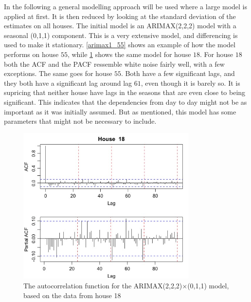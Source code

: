 \noindent In the following a general modelling approach will be used where a large model is applied at first. It is then reduced by looking at the standard deviation of the estimates on all houses. The initial model is an ARIMAX(2,2,2) model with a seasonal (0,1,1) component. This is a very extensive model, and differencing is used to make it stationary. \cref{arimax1_55} shows an example of how the model performs on house $55$, while \cref{arimax1_18} shows the same model for house $18$. For house $18$ both the ACF and the PACF ressemble white noise fairly well, with a few exceptions. The same goes for house $55$. Both have a few significant lags, and they both have a significant lag around lag $61$, even though it is barely so. It is supricing that neither house have lags in the seasons that are even close to being significant. This indicates that the dependencies from day to day might not be as important as it was initially assumed. But as mentioned, this model has some parameters that might not be necessary to include.




\begin{figure}
    \centering
    \includegraphics[width=0.8\textwidth]{../../../figures/arimax/Arimax1_18.jpeg}
    \caption{The autocorrelation function for the ARIMAX(2,2,2)$\times$(0,1,1) model, based on the data from house 18}
    \label{arimax1_18}
\end{figure}


